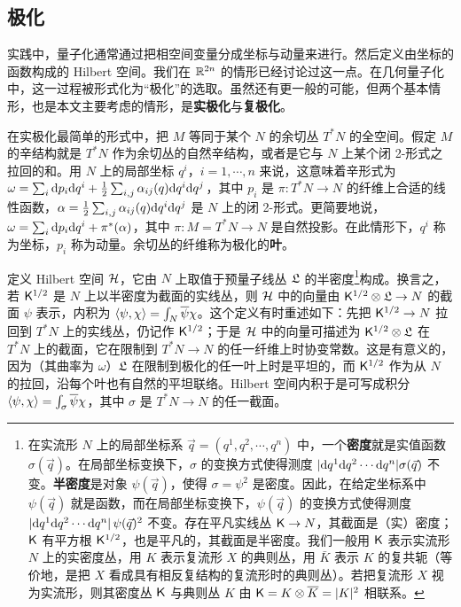 \subsection{极化}\label{gq}

实践中，量子化通常通过把相空间变量分成坐标与动量来进行。然后定义由坐标的函数构成的 Hilbert 空间。我们在 ${\mathbb R}^{2n}$ 的情形已经讨论过这一点。在几何量子化 \cite{Ko,So,Wo,Snia,Hall} 中，这一过程被形式化为“极化”的选取。虽然还有更一般的可能，但两个基本情形，也是本文主要考虑的情形，是\textbf{实极化}与\textbf{复极化}。

在实极化最简单的形式中，把 $M$ 等同于某个 $N$ 的余切丛 $T^*N$ 的全空间。假定 $M$ 的辛结构就是 $T^*N$ 作为余切丛的自然辛结构，或者是它与 $N$ 上某个闭 2-形式之拉回的和。用 $N$ 上的局部坐标 $q^i$，$i=1,\cdots,n$ 来说，这意味着辛形式为 $\omega =\sum_i {\mathrm d} p_i {\mathrm d} q^i +\frac{1}{2}\sum_{i,j}\alpha_{ij}(q) {\mathrm d} q^i{\mathrm d} q^j$，其中 $p_i$ 是 $\pi:T^*N\to N$ 的纤维上合适的线性函数，$\alpha=\frac{1}{2}\sum_{i,j}\alpha_{ij}(q) {\mathrm d} q^i{\mathrm d} q^j$ 是 $N$ 上的闭 2-形式。更简要地说，$\omega=\sum_i {\mathrm d} p_i {\mathrm d} q^i+\pi^*(\alpha)$，其中 $\pi:M=T^*N\to N$ 是自然投影。在此情形下，$q^i$ 称为坐标，$p_i$ 称为动量。余切丛的纤维称为极化的\textbf{叶}。

定义 Hilbert 空间 ${\mathcal H}$，它由 $N$ 上取值于预量子线丛 ${\mathfrak L}$ 的半密度\footnote{在实流形 $N$ 上的局部坐标系 $\vec q=(q^1,q^2,\cdots, q^n)$ 中，一个\textbf{密度}就是实值函数 $\sigma(\vec q)$。在局部坐标变换下，$\sigma$ 的变换方式使得测度 $|{\mathrm d} q^1{\mathrm d} q^2 \cdots {\mathrm d} q^n |\sigma(\vec q)$ 不变。\textbf{半密度}是对象 $\psi(\vec q)$，使得 $\sigma=\psi^2$ 是密度。因此，在给定坐标系中 $\psi(\vec q)$ 就是函数，而在局部坐标变换下，$\psi(\vec q)$ 的变换方式使得测度 $|{\mathrm d} q^1 {\mathrm d} q^2 \cdots {\mathrm d} q^n| \,\psi(\vec q)^2$ 不变。存在平凡实线丛 ${\sf K}\to N$，其截面是（实）密度；${\sf K}$ 有平方根 ${\sf K}^{1/2}$，也是平凡的，其截面是半密度。我们一般用 ${\sf K}$ 表示实流形 $N$ 上的实密度丛，用 $K$ 表示复流形 $X$ 的典则丛，用 $\bar K$ 表示 $K$ 的复共轭（等价地，是把 $X$ 看成具有相反复结构的复流形时的典则丛）。若把复流形 $X$ 视为实流形，则其密度丛 ${\sf K}$ 与典则丛 $K$ 由 ${\sf K}=K\otimes \overline K=|K|^2$ 相联系。}构成。换言之，若 ${\sf K}^{1/2}$ 是 $N$ 上以半密度为截面的实线丛，则 ${\mathcal H}$ 中的向量由 ${\sf K}^{1/2}\otimes {\mathfrak L}\to N$ 的截面 $\psi$ 表示，内积为 $\langle\psi,\chi\rangle=\int_N \overline\psi \chi$。这个定义有时重述如下：先把 ${\sf K}^{1/2}\to N$ 拉回到 $T^*N$ 上的实线丛，仍记作 ${\sf K}^{1/2}$；于是 ${\mathcal H}$ 中的向量可描述为 ${\sf K}^{1/2}\otimes {\mathfrak L}$ 在 $T^*N$ 上的截面，它在限制到 $T^*N\to N$ 的任一纤维上时协变常数。这是有意义的，因为（其曲率为 $\omega$）${\mathfrak L}$ 在限制到极化的任一叶上时是平坦的，而 ${\sf K}^{1/2}$ 作为从 $N$ 的拉回，沿每个叶也有自然的平坦联络。Hilbert 空间内积于是可写成积分 $\langle\psi,\chi\rangle=\int_\sigma \overline\psi\chi$，其中 $\sigma$ 是 $T^*N\to N$ 的任一截面。


